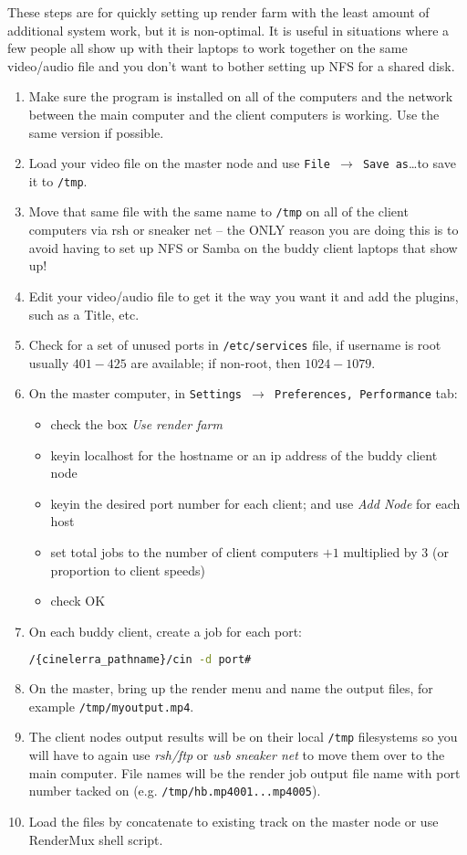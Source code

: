 These steps are for quickly setting up render farm with the least amount of additional system work, but it is non-optimal.  It is useful in situations where a few people all show up with their laptops to work together on the same video/audio file and you don’t want to bother setting up NFS for a shared disk.

\begin{enumerate}
    \item Make sure the \CGG{} program is installed on all of the computers and the network between the
    main computer and the client computers is working.  Use the same version if possible.
    \item Load your video file on the master node and use \texttt{File $\rightarrow$ Save as}\dots  to save it to \texttt{/tmp}.
    \item Move that same file with the same name to \texttt{/tmp} on all of the client computers via rsh or sneaker net -- the ONLY reason you are doing this is to avoid having to set up NFS or Samba on the buddy client
    laptops that show up!
    \item Edit your video/audio file to get it the way you want it and add the plugins, such as a Title, etc.
    \item Check for a set of unused ports in \texttt{/etc/services} file, if username is root usually $401-425$ are
    available; if non-root, then $1024-1079$.
    \item On the master computer, in \texttt{Settings $\rightarrow$ Preferences, Performance} tab:
    \begin{itemize}
        \item check the box \textit{Use render farm}
        \item keyin localhost for the hostname or an ip address of the buddy client node
        \item keyin the desired port number for each client; and use \textit{Add Node} for each host
        \item set total jobs to the number of client computers $+1$ multiplied by $3$ (or proportion to client speeds)
        \item check OK
    \end{itemize}
    \item On each buddy client, create a job for each port:    
    \begin{lstlisting}[language=bash,numbers=none]
/{cinelerra_pathname}/cin -d port#
    \end{lstlisting}
    \item On the master, bring up the render menu and name the output files, for example \texttt{/tmp/myoutput.mp4}.
    \item The client nodes output results will be on their local \texttt{/tmp} filesystems so you will have to again use
    \textit{rsh/ftp} or \textit{usb sneaker net} to move them over to the main computer.  File names will be the render
    job output file name with port number tacked on (e.g. \texttt{/tmp/hb.mp4001...mp4005}).
    \item Load the files by concatenate to existing track on the master node or use RenderMux shell script.
\end{enumerate}

